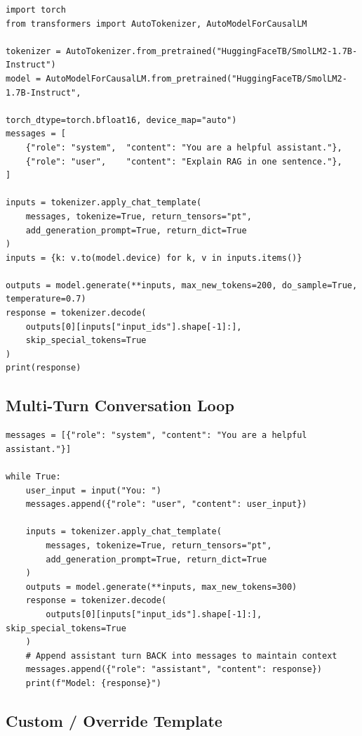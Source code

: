 \documentclass[11pt,a4paper]{article}
\begin{document}
\begin{lstlisting}[style=pycode]
import torch
from transformers import AutoTokenizer, AutoModelForCausalLM

tokenizer = AutoTokenizer.from_pretrained("HuggingFaceTB/SmolLM2-1.7B-Instruct")
model = AutoModelForCausalLM.from_pretrained("HuggingFaceTB/SmolLM2-1.7B-Instruct",
                                              torch_dtype=torch.bfloat16, device_map="auto")
messages = [
    {"role": "system",  "content": "You are a helpful assistant."},
    {"role": "user",    "content": "Explain RAG in one sentence."},
]

inputs = tokenizer.apply_chat_template(
    messages, tokenize=True, return_tensors="pt",
    add_generation_prompt=True, return_dict=True
)
inputs = {k: v.to(model.device) for k, v in inputs.items()}

outputs = model.generate(**inputs, max_new_tokens=200, do_sample=True, temperature=0.7)
response = tokenizer.decode(
    outputs[0][inputs["input_ids"].shape[-1]:],
    skip_special_tokens=True
)
print(response)
\end{lstlisting}

\subsection{Multi-Turn Conversation Loop}

\begin{lstlisting}[style=pycode]
messages = [{"role": "system", "content": "You are a helpful assistant."}]

while True:
    user_input = input("You: ")
    messages.append({"role": "user", "content": user_input})

    inputs = tokenizer.apply_chat_template(
        messages, tokenize=True, return_tensors="pt",
        add_generation_prompt=True, return_dict=True
    )
    outputs = model.generate(**inputs, max_new_tokens=300)
    response = tokenizer.decode(
        outputs[0][inputs["input_ids"].shape[-1]:], skip_special_tokens=True
    )
    # Append assistant turn BACK into messages to maintain context
    messages.append({"role": "assistant", "content": response})
    print(f"Model: {response}")
\end{lstlisting}

\subsection{Custom / Override Template}
\end{document}
